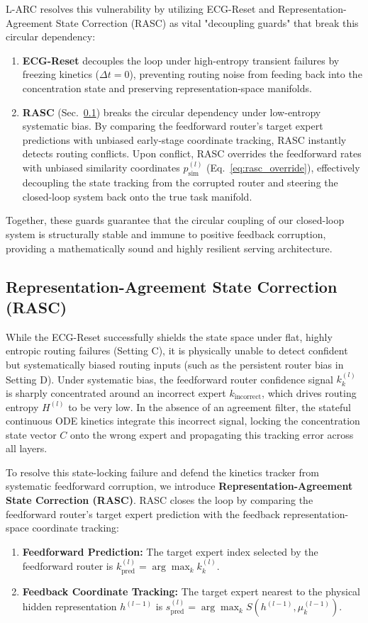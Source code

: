 L-ARC resolves this vulnerability by utilizing ECG-Reset and Representation-Agreement State Correction (RASC) as vital "decoupling guards" that break this circular dependency:
\begin{enumerate}
    \item \textbf{ECG-Reset} decouples the loop under high-entropy transient failures by freezing kinetics ($\Delta t = 0$), preventing routing noise from feeding back into the concentration state and preserving representation-space manifolds.
    \item \textbf{RASC} (Sec.~\ref{sec:rasc_method}) breaks the circular dependency under low-entropy systematic bias. By comparing the feedforward router's target expert predictions with unbiased early-stage coordinate tracking, RASC instantly detects routing conflicts. Upon conflict, RASC overrides the feedforward rates with unbiased similarity coordinates $p_{\text{sim}}^{(l)}$ (Eq.~\ref{eq:rasc_override}), effectively decoupling the state tracking from the corrupted router and steering the closed-loop system back onto the true task manifold.
\end{enumerate}
Together, these guards guarantee that the circular coupling of our closed-loop system is structurally stable and immune to positive feedback corruption, providing a mathematically sound and highly resilient serving architecture.

\subsection{Representation-Agreement State Correction (RASC)}
\label{sec:rasc_method}
While the ECG-Reset successfully shields the state space under flat, highly entropic routing failures (Setting C), it is physically unable to detect confident but systematically biased routing inputs (such as the persistent router bias in Setting D). Under systematic bias, the feedforward router confidence signal $k_k^{(l)}$ is sharply concentrated around an incorrect expert $k_{\text{incorrect}}$, which drives routing entropy $H^{(l)}$ to be very low. In the absence of an agreement filter, the stateful continuous ODE kinetics integrate this incorrect signal, locking the concentration state vector $C$ onto the wrong expert and propagating this tracking error across all layers.

To resolve this state-locking failure and defend the kinetics tracker from systematic feedforward corruption, we introduce \textbf{Representation-Agreement State Correction (RASC)}. RASC closes the loop by comparing the feedforward router's target expert prediction with the feedback representation-space coordinate tracking:
\begin{enumerate}
    \item \textbf{Feedforward Prediction:} The target expert index selected by the feedforward router is $k_{\text{pred}}^{(l)} = \arg\max_k k_k^{(l)}$.
    \item \textbf{Feedback Coordinate Tracking:} The target expert nearest to the physical hidden representation $h^{(l-1)}$ is $s_{\text{pred}}^{(l)} = \arg\max_k S(h^{(l-1)}, \mu_k^{(l-1)})$.
\end{enumerate}

